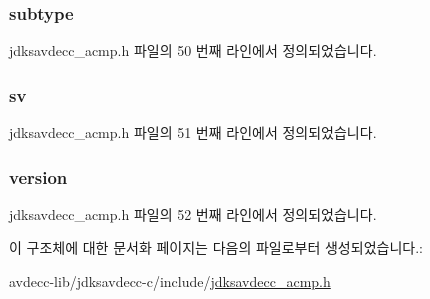 \subsubsection[{\texorpdfstring{subtype}{subtype}}]{ subtype}\hypertarget{structjdksavdecc__acmpdu__common__control__header_aed06f4a516930ca81d204d53c61a1ef3}{}\label{structjdksavdecc__acmpdu__common__control__header_aed06f4a516930ca81d204d53c61a1ef3}


jdksavdecc\+\_\+acmp.\+h 파일의 50 번째 라인에서 정의되었습니다.

\subsubsection[{\texorpdfstring{sv}{sv}}]{ sv}\hypertarget{structjdksavdecc__acmpdu__common__control__header_a9eeedef9f348218323834a3cf44d64c4}{}\label{structjdksavdecc__acmpdu__common__control__header_a9eeedef9f348218323834a3cf44d64c4}


jdksavdecc\+\_\+acmp.\+h 파일의 51 번째 라인에서 정의되었습니다.

\subsubsection[{\texorpdfstring{version}{version}}]{ version}\hypertarget{structjdksavdecc__acmpdu__common__control__header_acd99bb05ca015e7d74448acb1deba7ca}{}\label{structjdksavdecc__acmpdu__common__control__header_acd99bb05ca015e7d74448acb1deba7ca}


jdksavdecc\+\_\+acmp.\+h 파일의 52 번째 라인에서 정의되었습니다.



이 구조체에 대한 문서화 페이지는 다음의 파일로부터 생성되었습니다.\+:\begin{DoxyCompactItemize}
\item 
avdecc-\/lib/jdksavdecc-\/c/include/\hyperlink{jdksavdecc__acmp_8h}{jdksavdecc\+\_\+acmp.\+h}\end{DoxyCompactItemize}

